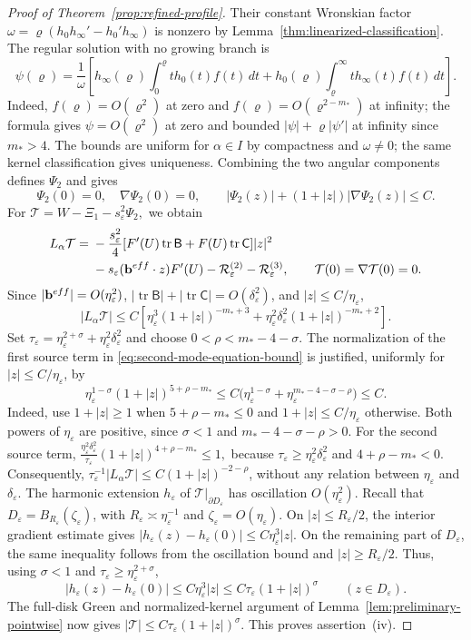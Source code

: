 \documentclass[10pt,a4paper]{amsart}
\numberwithin{equation}{section}
\theoremstyle{definition}
\theoremstyle{remark}
\newcommand{\eps}{\varepsilon}
\newcommand{\etae}{\eta_{\eps}}
\newcommand{\de}{\delta_{\eps}}
\newcommand{\tr}{\operatorname{tr}}
\begin{document}
\begin{proof}[Proof of Theorem~\ref{prop:refined-profile}]
Their constant Wronskian factor
$\omega=\varrho(h_0h_\infty'-h_0'h_\infty)$ is nonzero by
Lemma~\ref{thm:linearized-classification}. The regular solution with
no growing branch is
\[
 \psi(\varrho)=\frac1\omega\left[
 h_\infty(\varrho)\int_0^\varrho t h_0(t)f(t)\,dt
 +h_0(\varrho)\int_\varrho^\infty t h_\infty(t)f(t)\,dt\right].
\]
Indeed, $f(\varrho)=O(\varrho^2)$ at zero and
$f(\varrho)=O(\varrho^{2-m_*})$ at infinity;
the formula gives $\psi=O(\varrho^2)$ at zero and bounded
$|\psi|+\varrho|\psi'|$ at infinity since $m_*>4$.
The bounds are uniform for $\alpha\in I$ by compactness and
$\omega\ne0$; the same kernel classification gives uniqueness.
Combining the two angular components defines $\Psi_2$ and gives
\begin{equation}\label{eq:Psi2-bound}
 \Psi_2(0)=0,\quad\nabla\Psi_2(0)=0,\qquad
 |\Psi_2(z)|+(1+|z|)|\nabla\Psi_2(z)|\le C.
\end{equation}
For \(
 \mathcal T=W-\Xi_1-s_\eps^2\Psi_2,\)
we obtain
\begin{align}
 L_\alpha\mathcal T
 ={}&-\frac{s_\eps^2}{4}[F'(U)\tr\mathsf B+F(U)\tr\mathsf C]|z|^2
 \notag\\
 &-s_\eps(\mathbf{b}^{\rm eff}\cdot z)F'(U)
   -\mathcal R_\eps^{(2)}-\mathcal R_\eps^{(3)},
 \qquad\mathcal T(0)=\nabla\mathcal T(0)=0.
 \label{eq:W-second-equation-correct}
\end{align}
Since $|\mathbf{b}^{\rm eff}|=O(\etae^2)$,
$|\tr\mathsf B|+|\tr\mathsf C|=O(\de^2)$, and $|z|\le C/\etae$,
\begin{equation}\label{eq:second-mode-equation-bound}
 |L_\alpha\mathcal T|
 \le C[\etae^3(1+|z|)^{-m_*+3}
       +\etae^2\de^2(1+|z|)^{-m_*+2}].
\end{equation}
Set $\tau_\eps=\etae^{2+\sigma}+\etae^2\de^2$ and choose
$0<\rho<m_*-4-\sigma$. The normalization of the first source term in
\eqref{eq:second-mode-equation-bound} is justified, uniformly for
$|z|\le C/\etae$, by
\[
 \etae^{1-\sigma}(1+|z|)^{5+\rho-m_*}
 \le C\bigl(\etae^{1-\sigma}
             +\etae^{m_*-4-\sigma-\rho}\bigr)\le C.
\]
Indeed, use $1+|z|\ge1$ when $5+\rho-m_*\le0$ and
$1+|z|\le C/\etae$ otherwise. Both powers of $\etae$ are positive,
since $\sigma<1$ and $m_*-4-\sigma-\rho>0$.
For the second source term,
\(\frac{\etae^2\de^2}{\tau_\eps} (1+|z|)^{4+\rho-m_*}\le1,\)
because $\tau_\eps\ge\etae^2\de^2$ and $4+\rho-m_*<0$.
Consequently,
$\tau_\eps^{-1}|L_\alpha\mathcal T|
\le C(1+|z|)^{-2-\rho}$, without any relation between $\etae$ and $\de$.
The harmonic extension $h_\eps$ of $\mathcal T|_{\partial D_\eps}$
has oscillation $O(\etae^2)$. Recall that
$D_\eps=B_{R_\eps}(\zeta_\eps)$, with
$R_\eps\asymp\etae^{-1}$ and $\zeta_\eps=O(\etae)$.
On $|z|\le R_\eps/2$, the interior gradient estimate gives
$|h_\eps(z)-h_\eps(0)|\le C\etae^3|z|$.
On the remaining part of $D_\eps$, the same inequality follows from
the oscillation bound and $|z|\ge R_\eps/2$.
Thus, using $\sigma<1$ and $\tau_\eps\ge\etae^{2+\sigma}$,
\[
 |h_\eps(z)-h_\eps(0)|\le C\etae^3|z|
 \le C\tau_\eps(1+|z|)^\sigma\qquad(z\in D_\eps).
\]
The full-disk Green and normalized-kernel argument of
Lemma~\ref{lem:preliminary-pointwise} now gives
$|\mathcal T|\le C\tau_\eps(1+|z|)^\sigma$.
This proves assertion~(iv).


\end{proof}
\end{document}
